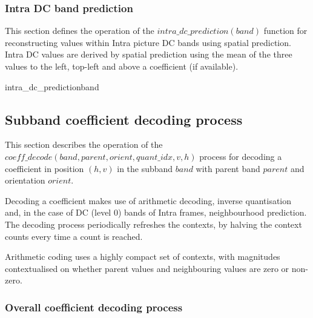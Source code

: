 \subsubsection{Intra DC band prediction}
\label{intradcprediction}

This section defines the operation of the $intra\_dc\_prediction(band)$ function
for reconstructing values within Intra picture DC bands using spatial prediction.
Intra DC values are derived by spatial prediction using the mean of the
three values to the left, top-left and above a coefficient (if available).

\begin{pseudo}{intra\_dc\_prediction}{band}

      \bsEND
    \bsELSE
      \bsEND
    \bsEND
  \bsEND
\bsEND
\end{pseudo}

\subsection{Subband coefficient decoding process}

\label{wltcoeff}

This section describes the operation of the 
$coeff\_decode(band,parent,orient,quant\_idx,v,h)$ process
for decoding a coefficient in position $(h,v)$ in the subband $band$ with
parent band $parent$ and orientation $orient$.

Decoding a coefficient makes use of arithmetic decoding, inverse quantisation
and, in the case of DC (level 0) bands of Intra frames, neighbourhood prediction.
The decoding process periodically refreshes the contexts, by
halving the context counts every time a count is reached.

Arithmetic coding uses a highly compact set of contexts, 
with magnitudes contextualised on whether parent values
and neighbouring values are zero or non-zero.

\subsubsection{Overall coefficient decoding process}


